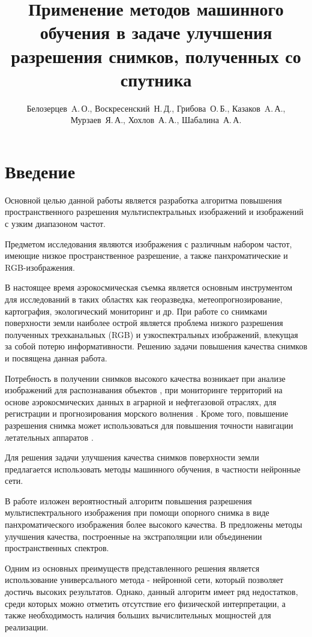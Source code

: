 \documentclass[12pt,twoside]{article}
\title
[Применение методов машинного обучения в задаче улучшения разрешения снимков] %
{Применение методов машинного обучения в задаче улучшения разрешения снимков, полученных со спутника}
\author
[Автор~И.\,О.] %
{Белозерцев~A.\,О., Воскресенский~Н.\,Д., Грибова~О.\,Б., Казаков~A.\,А., Мурзаев~Я.\,А., Хохлов~А.\,А., Шабалина~А.\,А.} %
[Белозерцев~A.\,О.$^1$, Воскресенский~Н.\,Д.$^1$, Грибова~О.\,Б.$^1$, Казаков~A.\,А.$^1$, Мурзаев~Я.\,А.$^1$, Хохлов~А.\,А.$^1$, Шабалина~А.\,А.$^1$] %
\begin{document}
\maketitle
\section{Введение}
	Основной целью данной работы является разработка алгоритма повышения пространственного разрешения мультиспектральных изображений и изображений с узким диапазоном частот. 
	
	Предметом исследования являются изображения с различным набором частот, имеющие низкое пространственное разрешение, а также панхроматические и RGB-изображения.
	
	В настоящее время аэрокосмическая съемка является основным инструментом для исследований в таких областях как георазведка, метеопрогнозирование, картография, экологический мониторинг и др. При работе со снимками поверхности земли наиболее острой является проблема низкого разрешения полученных трехканальных (RGB) и узкоспектральных изображений, влекущая за собой потерю информативности. Решению задачи повышения качества снимков и посвящена данная работа.
	
	Потребность в получении снимков высокого качества возникает при анализе изображений для распознавания объектов \cite{visilter2009rus}, при мониторинге территорий на основе аэрокосмических данных в аграрной \cite{murynin2013} и нефтегазовой \cite{bondur2012aero} отраслях, для регистрации и прогнозирования морского волнения \cite{bondur2016rusvosstanovlenie,bondur2016rusoptimalniy}. Кроме того, повышение разрешения снимка может использоваться для  повышения точности навигации летательных аппаратов \cite{ishutin2016rus,visilter2016ruscomplexirovaniye}.
	
	Для решения задачи улучшения качества снимков поверхности земли предлагается использовать методы машинного обучения, в частности нейронные сети. 
	
	В работе \cite{gorokhovskiy2017rus} изложен вероятностный алгоритм повышения разрешения мультиспектрального изображения при помощи опорного снимка в виде панхроматического изображения более высокого качества. В \cite{gurchenkov2016rus,bochkareva2016rus} предложены методы улучшения качества, построенные на экстраполяции или объединении пространственных спектров.
	
	Одним из основных преимуществ представленного решения является использование универсального метода - нейронной сети, который позволяет достичь высоких результатов. Однако, данный алгоритм имеет ряд недостатков, среди которых можно отметить отсутствие его физической интерпретации, а также необходимость наличия больших вычислительных мощностей для реализации.
	
\end{document}
